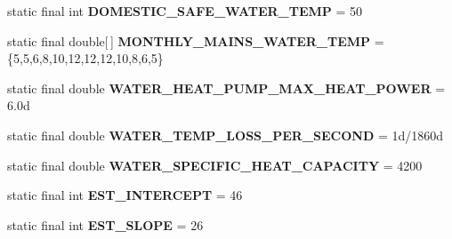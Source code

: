 \begin{DoxyCompactItemize}
\item 
\hypertarget{classuk_1_1ac_1_1dmu_1_1iesd_1_1cascade_1_1base_1_1_consts_a79027d39a78830f57bf7262bda49aed9}{static final int {\bfseries D\-O\-M\-E\-S\-T\-I\-C\-\_\-\-S\-A\-F\-E\-\_\-\-W\-A\-T\-E\-R\-\_\-\-T\-E\-M\-P} = 50}\label{classuk_1_1ac_1_1dmu_1_1iesd_1_1cascade_1_1base_1_1_consts_a79027d39a78830f57bf7262bda49aed9}

\item 
\hypertarget{classuk_1_1ac_1_1dmu_1_1iesd_1_1cascade_1_1base_1_1_consts_abe096e48e3ec23ef2574a3ee3216a030}{static final double\mbox{[}$\,$\mbox{]} {\bfseries M\-O\-N\-T\-H\-L\-Y\-\_\-\-M\-A\-I\-N\-S\-\_\-\-W\-A\-T\-E\-R\-\_\-\-T\-E\-M\-P} = \{5,5,6,8,10,12,12,12,10,8,6,5\}}\label{classuk_1_1ac_1_1dmu_1_1iesd_1_1cascade_1_1base_1_1_consts_abe096e48e3ec23ef2574a3ee3216a030}

\item 
\hypertarget{classuk_1_1ac_1_1dmu_1_1iesd_1_1cascade_1_1base_1_1_consts_abd9f9833700b5b87a43fbd6d143ecd4e}{static final double {\bfseries W\-A\-T\-E\-R\-\_\-\-H\-E\-A\-T\-\_\-\-P\-U\-M\-P\-\_\-\-M\-A\-X\-\_\-\-H\-E\-A\-T\-\_\-\-P\-O\-W\-E\-R} = 6.\-0d}\label{classuk_1_1ac_1_1dmu_1_1iesd_1_1cascade_1_1base_1_1_consts_abd9f9833700b5b87a43fbd6d143ecd4e}

\item 
\hypertarget{classuk_1_1ac_1_1dmu_1_1iesd_1_1cascade_1_1base_1_1_consts_af2577c6cbf998aa9873b7f188394c5fb}{static final double {\bfseries W\-A\-T\-E\-R\-\_\-\-T\-E\-M\-P\-\_\-\-L\-O\-S\-S\-\_\-\-P\-E\-R\-\_\-\-S\-E\-C\-O\-N\-D} = 1d/1860d}\label{classuk_1_1ac_1_1dmu_1_1iesd_1_1cascade_1_1base_1_1_consts_af2577c6cbf998aa9873b7f188394c5fb}

\item 
\hypertarget{classuk_1_1ac_1_1dmu_1_1iesd_1_1cascade_1_1base_1_1_consts_addf02a5c3843f13cf2c1dcd5ca5de338}{static final double {\bfseries W\-A\-T\-E\-R\-\_\-\-S\-P\-E\-C\-I\-F\-I\-C\-\_\-\-H\-E\-A\-T\-\_\-\-C\-A\-P\-A\-C\-I\-T\-Y} = 4200}\label{classuk_1_1ac_1_1dmu_1_1iesd_1_1cascade_1_1base_1_1_consts_addf02a5c3843f13cf2c1dcd5ca5de338}

\item 
\hypertarget{classuk_1_1ac_1_1dmu_1_1iesd_1_1cascade_1_1base_1_1_consts_ac21faf444229330ac9430d615bbc6939}{static final int {\bfseries E\-S\-T\-\_\-\-I\-N\-T\-E\-R\-C\-E\-P\-T} = 46}\label{classuk_1_1ac_1_1dmu_1_1iesd_1_1cascade_1_1base_1_1_consts_ac21faf444229330ac9430d615bbc6939}

\item 
\hypertarget{classuk_1_1ac_1_1dmu_1_1iesd_1_1cascade_1_1base_1_1_consts_a4aa54b82bb03f5ef27e71081983f2a3b}{static final int {\bfseries E\-S\-T\-\_\-\-S\-L\-O\-P\-E} = 26}\label{classuk_1_1ac_1_1dmu_1_1iesd_1_1cascade_1_1base_1_1_consts_a4aa54b82bb03f5ef27e71081983f2a3b}


\end{DoxyCompactItemize}
